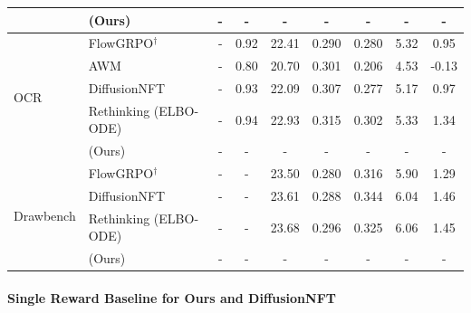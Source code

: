 \documentclass{article} %
\newcommand{\cellgray}{\cellcolor{indomgray}}
\begin{document}
\begin{table}[t]
{\begin{tabular}{ll ccccccc}
& (Ours)              & \cellgray - & - & - & - & - & - & - \\
\midrule
\multirow{5}{*}{OCR} 
& FlowGRPO$^\dagger$   & - & \cellgray 0.92 & 22.41 & 0.290 & 0.280 & 5.32 & 0.95 \\
& AWM                 & - & \cellgray 0.80 & 20.70 & 0.301 & 0.206 & 4.53 & -0.13 \\
& DiffusionNFT        & - & \cellgray 0.93 & \cellgray 22.09 & \cellgray 0.307 & \cellgray 0.277 & 5.17 & 0.97 \\
& Rethinking (ELBO-ODE) & - & \cellgray 0.94 & \cellgray 22.93 & \cellgray 0.315 & \cellgray 0.302 & 5.33 & 1.34 \\
& (Ours) & - & \cellgray - & \cellgray - & \cellgray - & \cellgray - & - & - \\
\midrule
\multirow{4}{*}{Drawbench} 
& FlowGRPO$^\dagger$   & - & - & \cellgray 23.50 & 0.280 & 0.316 & 5.90 & 1.29 \\
& DiffusionNFT        & - & - & \cellgray 23.61 & \cellgray 0.288 & \cellgray 0.344 & 6.04 & 1.46 \\
& Rethinking (ELBO-ODE) & - & - & \cellgray 23.68 & \cellgray 0.296 & \cellgray 0.325 & 6.06 & 1.45 \\
& (Ours) & - & - & \cellgray - & \cellgray - & \cellgray - & - & - \\
\bottomrule
\end{tabular}
}
\end{table} 




\paragraph{Single Reward Baseline for Ours and DiffusionNFT}
\end{document}
